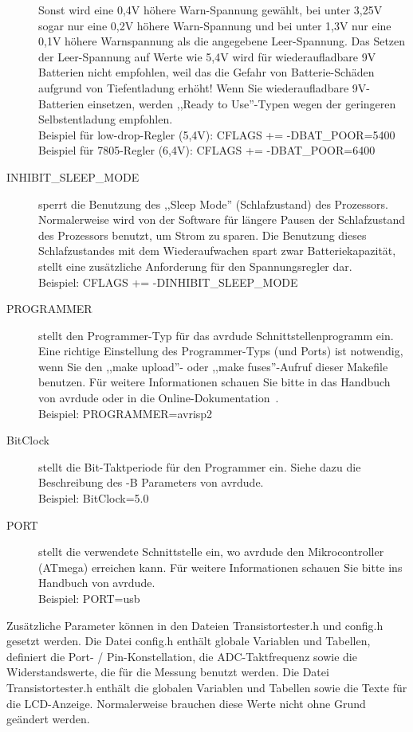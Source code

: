 \begin{description}
Sonst wird eine 0,4V höhere Warn-Spannung gewählt, bei unter 3,25V sogar nur eine 0,2V höhere Warn-Spannung und
bei unter 1,3V nur eine 0,1V höhere Warnspannung als die angegebene Leer-Spannung.
Das Setzen der Leer-Spannung auf Werte wie 5,4V wird für wiederaufladbare 9V Batterien nicht empfohlen,
weil das die Gefahr von Batterie-Schäden aufgrund von Tiefentladung erhöht!
Wenn Sie wiederaufladbare 9V-Batterien einsetzen, werden ,,Ready to Use''-Typen wegen der geringeren Selbstentladung empfohlen.\\
Beispiel für low-drop-Regler (5,4V): CFLAGS += -DBAT\_POOR=5400 \\
Beispiel für 7805-Regler (6,4V): CFLAGS += -DBAT\_POOR=6400
  \item[INHIBIT\_SLEEP\_MODE] sperrt die Benutzung des ,,Sleep Mode'' (Schlafzustand) des Prozessors.
Normalerweise wird von der Software für längere Pausen der Schlafzustand des Prozessors benutzt, um Strom zu sparen.
Die Benutzung dieses Schlafzustandes mit dem Wiederaufwachen spart zwar Batteriekapazität, 
stellt eine zusätzliche Anforderung für den Spannungsregler dar.\\
Beispiel: CFLAGS += -DINHIBIT\_SLEEP\_MODE
  \item[PROGRAMMER] stellt den Programmer-Typ für das avrdude Schnittstellenprogramm ein.
Eine richtige Einstellung des Programmer-Typs (und Ports) ist notwendig, wenn Sie den ,,make upload''- oder
,,make fuses''-Aufruf dieser Makefile benutzen.
Für weitere Informationen schauen Sie bitte in das Handbuch von avrdude oder in die Online-Dokumentation~\cite{avrdude}.\\
Beispiel: PROGRAMMER=avrisp2
  \item[BitClock] stellt die Bit-Taktperiode für den Programmer ein. Siehe dazu die Beschreibung des -B Parameters von avrdude.\\
Beispiel: BitClock=5.0
  \item[PORT] stellt die verwendete Schnittstelle ein, wo avrdude den Mikrocontroller (ATmega) erreichen kann.
Für weitere Informationen schauen Sie bitte ins Handbuch von avrdude.\\
Beispiel: PORT=usb

\end{description}

Zusätzliche Parameter können in den Dateien Transistortester.h und config.h gesetzt werden.
Die Datei config.h enthält globale Variablen und Tabellen, definiert die Port- / Pin-Konstellation,
die ADC-Taktfrequenz sowie die Widerstandswerte, die für die Messung benutzt werden.
Die Datei Transistortester.h enthält die globalen Variablen und Tabellen sowie die Texte für die LCD-Anzeige.
Normalerweise brauchen diese Werte nicht ohne Grund geändert werden.
